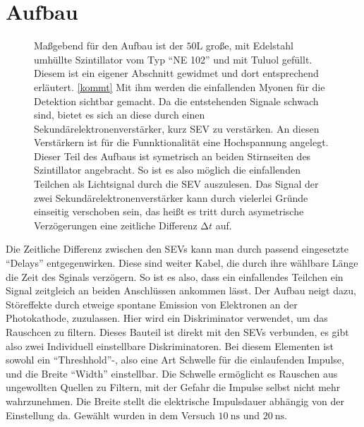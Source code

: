 \newpage
\section{Aufbau}
\begin{figure}
\begin{minipage}{0.49\textwidth}
Maßgebend für den Aufbau ist der $50 \si{\liter}$ große, mit Edelstahl umhüllte Szintillator vom Typ \enquote{NE 102} und mit Tuluol gefüllt. Diesem ist ein eigener Abschnitt gewidmet und dort entsprechend erläutert. \ref{kommt}
Mit ihm werden die einfallenden Myonen für die Detektion sichtbar gemacht. Da die entstehenden Signale schwach sind, bietet es sich an diese durch einen Sekundärelektronenverstärker, kurz SEV zu verstärken. An diesen Verstärkern ist für
die Funnktionalität eine Hochspannung angelegt. Dieser Teil des Aufbaus ist symetrisch an beiden Stirnseiten des Szintillator angebracht. So ist es also möglich die einfallenden Teilchen als Lichtsignal durch die SEV auszulesen.
Das Signal der zwei Sekundärelektronenverstärker kann durch vielerlei Gründe einseitig verschoben sein, das heißt es tritt durch asymetrische Verzögerungen eine zeitliche Differenz $\increment t$ auf.
\end{minipage}%
\begin{minipage}[h]{0.49\textwidth}
    \centering
\end{minipage}
\end{figure}
\vspace{0.5cm}
Die Zeitliche Differenz zwischen den SEVs kann man durch passend eingesetzte \enquote{Delays} entgegenwirken. Diese sind weiter Kabel, 
die durch ihre wählbare Länge die Zeit des Sginals verzögern. So ist es also, dass ein einfallendes Teilchen ein Signal zeitgleich an beiden Anschlüssen ankommen lässt.
Der Aufbau neigt dazu, Störeffekte durch etweige spontane Emission von Elektronen an der Photokathode, zuzulassen. Hier wird ein Diskriminator verwendet, um das Rauschcen zu filtern.
Dieses Bauteil ist direkt mit den SEVs verbunden, es gibt also zwei Individuell einstellbare Diskriminatoren. Bei diesem Elementen ist sowohl
ein \enquote{Threshhold}-, also eine Art Schwelle für die einlaufenden Impulse, und die Breite \enquote{Width} einstellbar.
Die Schwelle ermöglicht es Rauschen aus ungewollten Quellen zu Filtern, mit der Gefahr die Impulse selbst nicht mehr wahrzunehmen. 
Die Breite stellt die elektrische Impulsdauer abhängig von der Einstellung da. Gewählt wurden in dem Versuch $\SI{10}{\nano\second}$ und $\SI{20}{\nano\second}$.
